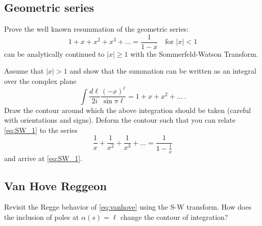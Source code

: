 
\subsection{Geometric series}

Prove the well known resummation of the geometric series:
    \begin{equation}
         1 + x + x^2 + x^3 + \dots =  \frac{1}{1-x} \quad \text{for } |x| < 1
    \end{equation}
can be analytically continued to $|x| \geq 1$ with the Sommerfeld-Watson Transform.

Assume that $|x| > 1$ and show that the summation can be written as an integral over the complex plane
    \begin{equation}
        \label{eq:SW_1}
         \int \frac{d\ell}{2i} \frac{(-x)^\ell}{\sin \pi \ell} = 1 + x + x^2 + \dots ~.
    \end{equation}
Draw the contour around which the above integration should be taken (careful with orientations and signs).
Deform the contour such that you can relate \cref{eq:SW_1} to the series
    \begin{equation}
        \frac{1}{x} + \frac{1}{x^2} + \frac{1}{x^3} + \dots = \frac{1}{1- \frac{1}{x}}
    \end{equation}
and arrive at \cref{eq:SW_1}.

\subsection{Van Hove Reggeon}
Revisit the Regge behavior of \cref{eq:vanhove} using the S-W transform. How does the inclusion of poles at $\alpha(s) = \ell$ change the contour of integration?
